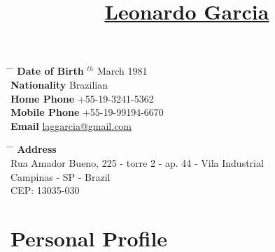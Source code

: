 \documentclass[10pt]{article} %
\begin{document}

\title{\href{https://br.linkedin.com/in/laggarcia}{Leonardo Garcia}} %


\parbox{0.5\textwidth}{ %
\begin{tabbing} %
\hspace{3cm} \= \hspace{4cm} \= \kill %
{\bf Date of Birth} $^{th}$ March 1981 \\ %
{\bf Nationality} \> Brazilian \\ %
{\bf Home Phone} \> +55-19-3241-5362 \\ %
{\bf Mobile Phone} \> +55-19-99194-6670 \\ %
{\bf Email} \> \href{mailto:laggarcia@gmail.com}{laggarcia@gmail.com} \\ %
\end{tabbing}}
\hfill %
\parbox{0.5\textwidth}{ %
\begin{tabbing} %
\hspace{3cm} \= \hspace{4cm} \= \kill %
{\bf Address} \\
Rua Amador Bueno, 225 - torre 2 - ap. 44 - Vila Industrial \\ %
Campinas - SP - Brazil \\ %
CEP: 13035-030 \\ %
\end{tabbing}}


\section{Personal Profile}

\end{document}

